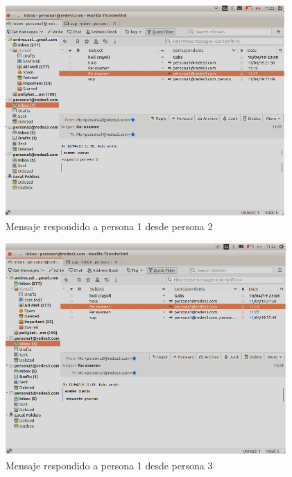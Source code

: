 \begin{figure}[H]
    \centering
    \includegraphics[scale=1.20]{imagenes/primero/evidencia3_smtp.PNG}
    \caption{Mensaje respondido a persona 1 desde persona 2}
    \label{fig:smtp31}
\end{figure}

\begin{figure}[H]
    \centering
    \includegraphics[scale=1.20]{imagenes/primero/evidencia4_smtp.PNG}
    \caption{Mensaje respondido a persona 1 desde persona 3}
    \label{fig:smtp32}
\end{figure}